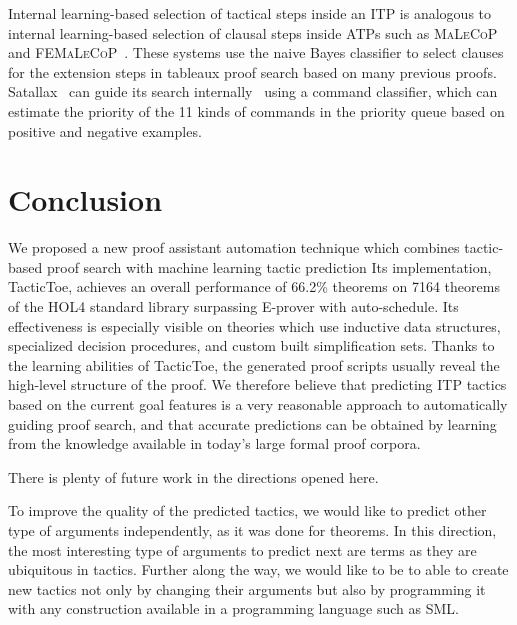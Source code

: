 \documentclass[runningheads,a4paper,draft]{svjour3}
\newcommand{\todoi}[1]{\todo[inline]{#1}}
\def\holfour{\textsf{HOL4}\xspace}
\def\hollight{\textsf{HOL Light}\xspace}
\def\eprover{\textsf{E-prover}\xspace}
\def\sml{\textsf{SML}\xspace}
\def\tactictoe{\textsf{TacticToe}\xspace}
\begin{document}
Internal learning-based selection of tactical steps inside an ITP is analogous
to internal learning-based selection of clausal steps inside ATPs such as
\textsc{MaLeCoP}~\cite{malecop} and \textsc{FEMaLeCoP}~\cite{femalecop}. These
systems
use the naive Bayes classifier to  select clauses for the extension steps in
tableaux proof search based on many previous proofs. Satallax~\cite{Brown2012a}
can guide its
search internally~\cite{mllax} using a command classifier, which can estimate
the priority of the 11 kinds of
commands in the priority queue based on positive and negative examples.


\section{Conclusion}\label{sec:concl}


\todoi{Is copied and modified}
We proposed a new proof assistant automation technique which combines
tactic-based proof search with machine learning tactic prediction
Its implementation,
\tactictoe, achieves an overall performance of 66.2\% theorems on 7164
theorems
of the \holfour standard library surpassing \eprover with
auto-schedule. Its
effectiveness is especially visible on
theories which use inductive data structures, specialized decision procedures,
and custom built simplification sets.
Thanks to the learning abilities of \tactictoe, the generated proof scripts
usually reveal the high-level structure of the proof. %
We therefore believe that predicting ITP tactics based on the current goal
features is a very reasonable approach to automatically guiding proof search,
and that accurate predictions can be obtained by learning from the knowledge
available in today's large formal proof corpora.



There is plenty of future work in the directions opened here.

To improve the quality of the predicted tactics,
we would like to predict other type of arguments independently, as it was done 
for theorems. In this direction, the most interesting type of arguments to 
predict next are terms as they are ubiquitous in tactics. Further along the way,
we would like to be to able to create new tactics not only by changing their 
arguments but also by programming it with any construction available in a
programming language such as \sml.
\end{document}
